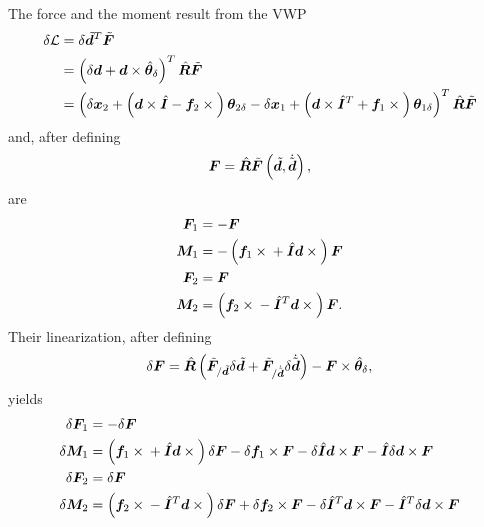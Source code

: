 \documentclass[10pt,fleqn,subeqn]{report}
\newcommand{\T}[1]{\bm{#1}}
\begin{document}
The force and the moment result from the VWP
\begin{align}
	\delta\mathcal{L}
	&= \delta \tilde{\T{d}}^T \tilde{\T{F}} \nonumber \\
	&= \plbr{
		\delta\T{d}
		+ \T{d} \times \hat{\T{\theta}}_{\delta}
	}^T \hat{\T{R}} \tilde{\T{F}} \nonumber \\
	&= \plbr{
		\delta\T{x}_2
		+ \plbr{
			\T{d}\times\hat{\T{I}}
			- \T{f}_2\times{}
		} \T{\theta}_{2\delta}
		- \delta\T{x}_1
		+ \plbr{
			\T{d}\times\hat{\T{I}}^T
			+ \T{f}_1\times{}
		} \T{\theta}_{1\delta}
	}^T \hat{\T{R}} \tilde{\T{F}}
\end{align}
and, after defining
\begin{equation}
	\T{F} = \hat{\T{R}}
		\tilde{\T{F}}\plbr{\tilde{\T{d}}, \dot{\tilde{\T{d}}}} ,
\end{equation}
 are
\begin{subequations}
\begin{align}
	\T{F}_1 &= - \T{F} \\
	\T{M}_1 &= - \plbr{
		\T{f}_1 \times{}
		+ \hat{\T{I}} \T{d}\times{}
	} \T{F} \\
	\T{F}_2 &= \T{F} \\
	\T{M}_2 &= \plbr{
		\T{f}_2 \times{}
		- \hat{\T{I}}^T \T{d}\times{}
	} \T{F} .
\end{align}
\end{subequations}
Their linearization, after defining
\begin{equation}
	\delta\T{F} = \hat{\T{R}} \plbr{
		\tilde{\T{F}}_{/\tilde{\T{d}}} \delta{\tilde{\T{d}}}
		+ \tilde{\T{F}}_{/\dot{\tilde{\T{d}}}} \delta\dot{\tilde{\T{d}}}
	} - \T{F} \times \hat{\T{\theta}}_{\delta} ,
\end{equation}
yields
\begin{subequations}
\begin{align}
	\delta\T{F}_1 &= - \delta\T{F} \\
	\delta\T{M}_1 &= \plbr{
		\T{f}_1 \times{}
		+ \hat{\T{I}} \T{d}\times{}
	} \delta\T{F}
	- \delta\T{f}_1 \times \T{F}
	- \delta\hat{\T{I}} \T{d} \times \T{F}
	- \hat{\T{I}} \delta\T{d} \times \T{F} \\
	\delta\T{F}_2 &= \delta\T{F} \\
	\delta\T{M}_2 &= \plbr{
		\T{f}_2 \times{}
		- \hat{\T{I}}^T \T{d} \times{}
	} \delta\T{F}
	+ \delta\T{f}_2 \times \T{F}
	- \delta\hat{\T{I}}^T \T{d} \times \T{F}
	- \hat{\T{I}}^T \delta\T{d} \times \T{F}
\end{align}
\end{subequations}
\end{document}
